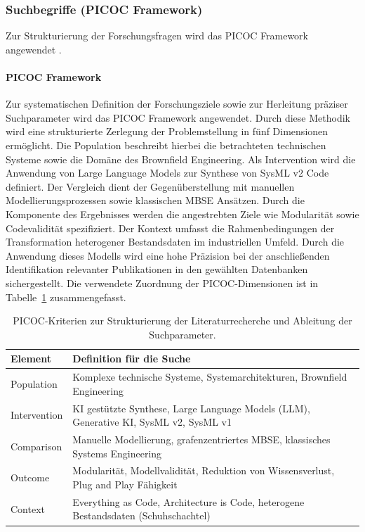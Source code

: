 \subsubsection{Suchbegriffe (PICOC Framework)}

Zur Strukturierung der Forschungsfragen wird das PICOC Framework angewendet \cite{Wohlin.2012}.
\paragraph{PICOC Framework}

Zur systematischen Definition der Forschungsziele sowie zur Herleitung präziser Suchparameter wird das PICOC Framework angewendet. Durch diese Methodik wird eine strukturierte Zerlegung der Problemstellung in fünf Dimensionen ermöglicht. Die Population beschreibt hierbei die betrachteten technischen Systeme sowie die Domäne des Brownfield Engineering. Als Intervention wird die Anwendung von Large Language Models zur Synthese von SysML v2 Code definiert. Der Vergleich dient der Gegenüberstellung mit manuellen Modellierungsprozessen sowie klassischen MBSE Ansätzen. Durch die Komponente des Ergebnisses werden die angestrebten Ziele wie Modularität sowie Codevalidität spezifiziert. Der Kontext umfasst die Rahmenbedingungen der Transformation heterogener Bestandsdaten im industriellen Umfeld. Durch die Anwendung dieses Modells wird eine hohe Präzision bei der anschließenden Identifikation relevanter Publikationen in den gewählten Datenbanken sichergestellt.
Die verwendete Zuordnung der PICOC-Dimensionen ist in
Tabelle~\ref{tab:picoc_kriterien} zusammengefasst.

\begin{table}[h]
\caption[PICOC-Kriterien der Literaturrecherche]{
PICOC-Kriterien zur Strukturierung der Literaturrecherche und Ableitung der
Suchparameter.}
\label{tab:picoc_kriterien}
\centering
\begin{tabular}{|l|p{10cm}|}
\hline
\textbf{Element} & \textbf{Definition für die Suche} \\ \hline
Population & Komplexe technische Systeme, Systemarchitekturen, Brownfield Engineering \\ \hline
Intervention & KI gestützte Synthese, Large Language Models (LLM), Generative KI, SysML v2, SysML v1 \\ \hline
Comparison & Manuelle Modellierung, grafenzentriertes MBSE, klassisches Systems Engineering \\ \hline
Outcome & Modularität, Modellvalidität, Reduktion von Wissensverlust, Plug and Play Fähigkeit \\ \hline
Context & Everything as Code, Architecture is Code, heterogene Bestandsdaten (Schuhschachtel) \\ \hline
\end{tabular}
\end{table}

